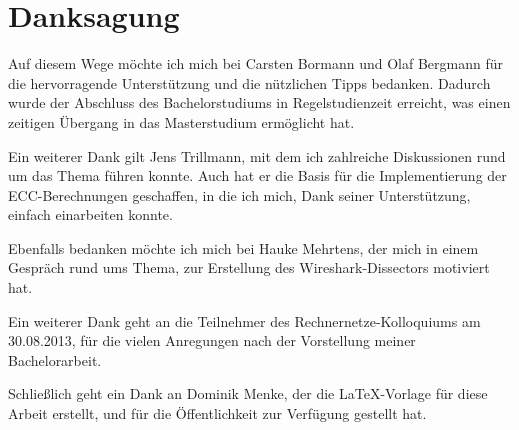 \section*{Danksagung}

Auf diesem Wege möchte ich mich bei Carsten Bormann und Olaf Bergmann für die hervorragende Unterstützung und die nützlichen Tipps bedanken.
Dadurch wurde der Abschluss des Bachelorstudiums in Regelstudienzeit erreicht, was einen zeitigen Übergang in das Masterstudium ermöglicht hat.

Ein weiterer Dank gilt Jens Trillmann, mit dem ich zahlreiche Diskussionen rund um das Thema führen konnte. Auch hat er die Basis
für die Implementierung der ECC-Berechnungen geschaffen, in die ich mich, Dank seiner Unterstützung, einfach einarbeiten konnte.

Ebenfalls bedanken möchte ich mich bei Hauke Mehrtens, der mich in einem Gespräch rund ums Thema, zur Erstellung des Wireshark-Dissectors motiviert hat.

Ein weiterer Dank geht an die Teilnehmer des Rechnernetze-Kolloquiums am 30.08.2013, für die vielen Anregungen nach der Vorstellung meiner Bachelorarbeit.

Schließlich geht ein Dank an Dominik Menke, der die LaTeX-Vorlage für diese Arbeit erstellt, und für die Öffentlichkeit zur Verfügung gestellt hat.